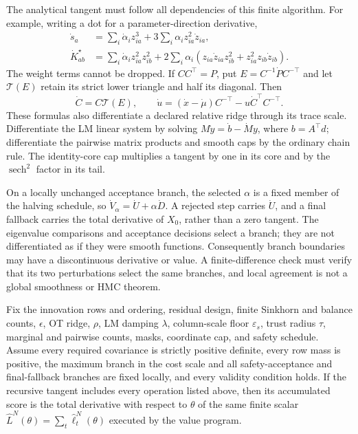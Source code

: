 The analytical tangent must follow all dependencies of this finite algorithm.
For example, writing a dot for a parameter-direction derivative,
\begin{align}
 \dot s_a&=\sum_i\dot\alpha_i z_{ia}^3
          +3\sum_i\alpha_i z_{ia}^2\dot z_{ia},\\
 \dot K^\star_{ab}&=\sum_i\dot\alpha_i z_{ia}^2z_{ib}^2
       +2\sum_i\alpha_i(z_{ia}\dot z_{ia}z_{ib}^2
                        +z_{ia}^2z_{ib}\dot z_{ib}).
 \label{eq:bf-eot-hm-target-total-tangents}
\end{align}
The weight terms cannot be dropped.  If \(CC^\top=P\), put
\(E=C^{-1}\dot P C^{-\top}\) and let \(\mathcal T(E)\) retain its strict
lower triangle and half its diagonal.  Then
\begin{equation}
 \dot C=C\mathcal T(E),\qquad
 \dot u=(\dot x-\dot\mu)C^{-\top}
           -u\dot C^\top C^{-\top}.
 \label{eq:bf-eot-hm-whitening-total-tangent}
\end{equation}
These formulas also differentiate a declared relative ridge through its trace
scale.  Differentiate the LM linear system by solving
\(M\dot y=\dot b-\dot M y\), where \(b=A^\top d\); differentiate the
pairwise matrix products and smooth caps by the ordinary chain rule.
The identity-core cap multiplies a tangent by one in its core and by the
\(\operatorname{sech}^2\) factor in its tail.

On a locally unchanged acceptance branch, the selected \(\alpha\) is a fixed
member of the halving schedule, so
\(\dot V_\alpha=\dot U+\alpha\dot D\).  A rejected step carries \(\dot U\),
and a final fallback carries the total derivative of \(X_0\), rather than a
zero tangent.  The eigenvalue comparisons and acceptance decisions select a
branch; they are not differentiated as if they were smooth functions.
Consequently branch boundaries may have a discontinuous derivative or value.
A finite-difference check must verify that its two perturbations select the
same branches, and local agreement is not a global smoothness or HMC theorem.

\begin{proposition}
\label{prop:bf-eot-hm-score}
Fix the innovation rows and ordering, residual design, finite Sinkhorn and
balance counts, \(\epsilon\), OT ridge, \(\rho\), LM damping \(\lambda\),
column-scale floor \(\varepsilon_s\), trust radius \(\tau\), marginal and
pairwise counts, masks, coordinate cap, and safety schedule.
Assume every required covariance is strictly positive definite, every row mass
is positive, the maximum branch in the cost scale and all safety-acceptance
and final-fallback branches are fixed locally, and every validity condition holds.  If the recursive tangent includes every operation
listed above, then its accumulated score is the total derivative with respect
to \(\theta\) of the same finite scalar
\(\widehat L^N(\theta)=\sum_t\widehat\ell_t^N(\theta)\) executed by the value
program.
\end{proposition}

